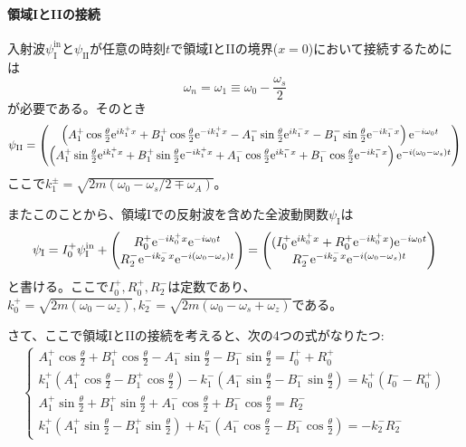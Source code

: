 \paragraph{領域IとIIの接続}
入射波$\psi_\mathrm{I}^\mathrm{in}$と$\psi_\mathrm{II}$が任意の時刻$t$で領域IとIIの境界($x=0$)において接続するためには
\begin{equation}
\omega_n=\omega_1 \equiv \omega_0 -\frac{\omega_s}{2}
\end{equation}
が必要である。そのとき
\begin{equation}
\psi_\mathrm{II}=\begin{pmatrix} \left(A_1^+ \cos \frac{\theta}{2} \mathrm{e}^{ik_1^+x}+ B_1^+ \cos \frac{\theta}{2} \mathrm{e}^{-ik_1^+x} - A_1^- \sin \frac{\theta}{2} \mathrm{e}^{ik_1^-x}- B_1^- \sin \frac{\theta}{2} \mathrm{e}^{-ik_1^-x}\right) \mathrm{e}^{-i\omega_0t} \\ \left(A_1^+ \sin \frac{\theta}{2} \mathrm{e}^{ik_1^+x}+ B_1^+ \sin \frac{\theta}{2} \mathrm{e}^{-ik_1^+x} + A_1^- \cos \frac{\theta}{2} \mathrm{e}^{ik_1^-x}+ B_1^- \cos \frac{\theta}{2} \mathrm{e}^{-ik_1^-x}\right) \mathrm{e}^{-i(\omega_0-\omega_s)t} \end{pmatrix}
\end{equation}
ここで$k_1^\pm=\sqrt{2m(\omega_0-\omega_s/2 \mp \omega_A)}$。

またこのことから、領域Iでの反射波を含めた全波動関数$\psi_\mathrm{I}$は
\begin{equation}
\psi_\mathrm{I} =I_0^+ \psi_\mathrm{I}^\mathrm{in} +\begin{pmatrix} R_0^+ \mathrm{e}^{-ik_0^+x}\mathrm{e}^{ -i\omega_0 t} \\ R_2^- \mathrm{e}^{-ik_2^-x}\mathrm{e}^{ -i (\omega_0-\omega_s)t} \end{pmatrix} =\begin{pmatrix} (I_0^+ \mathrm{e}^{ik_0^+x} +R_0^+\mathrm{e}^{-ik_0^+x} )\mathrm{e}^{-i\omega_0 t} \\ R_2^- \mathrm{e}^{-ik_2^-x}\mathrm{e}^{ -i (\omega_0-\omega_s)t} \end{pmatrix}
\end{equation}
と書ける。ここで$I_0^+,R_0^+,R_2^-$は定数であり、$k_0^+ =\sqrt{2m(\omega_0 -\omega_z)},k_2^- =\sqrt{2m(\omega_0 -\omega_s +\omega_z)}$である。

さて、ここで領域IとIIの接続を考えると、次の4つの式がなりたつ:
\begin{align}
\left\{\begin{array}{l}
A_1^+ \cos \frac{\theta}{2} +B_1^+\cos \frac{\theta}{2} -A_1^-\sin\frac{\theta}{2} -B_1^-\sin\frac{\theta}{2} = I_0^+ +R_0^+ \\
k_1^+(A_1^+ \cos \frac{\theta}{2} -B_1^+\cos \frac{\theta}{2} )-k_1^-(A_1^-\sin\frac{\theta}{2} -B_1^-\sin\frac{\theta}{2} )=k_0^+(I_0^--R_0^+)\\
A_1^+ \sin \frac{\theta}{2} +B_1^+\sin \frac{\theta}{2} +A_1^-\cos\frac{\theta}{2} +B_1^-\cos\frac{\theta}{2} = R_2^- \\
k_1^+(A_1^+ \sin \frac{\theta}{2} -B_1^+\sin \frac{\theta}{2}) +k_1^-(A_1^-\cos\frac{\theta}{2} -B_1^-\cos\frac{\theta}{2}) = -k_2^-R_2^-
\end{array} \right. \label{Resonance_setsuzoku}
\end{align}

